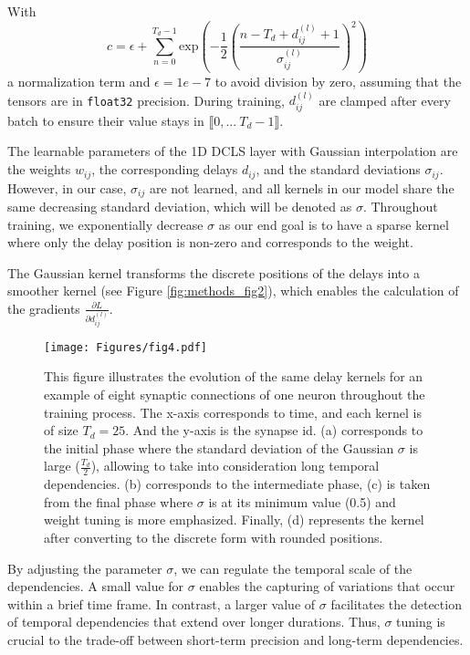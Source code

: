 \documentclass{article} \usepackage{iclr2024_conference,times}
\begin{document}
With \begin{equation} 
c = \epsilon + \sum_{n=0}^{T_d -1} \text{exp} \left({- \frac{1}{2}\left(\frac{n - T_d + d_{ij}^{(l)} + 1 }{\sigma_{ij}^{(l)}} \right)^2} \right)
\end{equation} a normalization term and $\epsilon = 1e-7$ to avoid division by zero, assuming that the tensors are in \texttt{float32} precision. During training, $d_{ij}^{(l)}$ are clamped after every batch to ensure their value stays in $\llbracket 0, ... \ T_d-1 \rrbracket$.

The learnable parameters of the 1D DCLS layer with Gaussian interpolation are the weights $w_{ij}$, the corresponding delays $d_{ij}$, and the standard deviations $\sigma_{ij}$. However, in our case, $\sigma_{ij}$ are not learned, and all kernels in our model share the same decreasing standard deviation, which will be denoted as $\sigma$. Throughout training, we exponentially decrease $\sigma$ as our end goal is to have a sparse kernel where only the delay position is non-zero and corresponds to the weight.

The Gaussian kernel transforms the discrete positions of the delays into a smoother kernel (see Figure \ref{fig:methods_fig2}), which enables the calculation of the gradients $\frac{\partial L}{\partial d_{ij}^{(l)}}$.

\begin{figure}[!ht]

  \centering
  \texttt{[image: Figures/fig4.pdf]}
  \caption{ This figure illustrates the evolution of the same delay kernels for an example of eight synaptic connections of one neuron throughout the training process. The x-axis corresponds to time, and each kernel is of size $T_d=25$. And the y-axis is the synapse id. (a) corresponds to the initial phase where the standard deviation of the Gaussian $\sigma$ is large ($\frac{T_d}{2}$), allowing to take into consideration long temporal dependencies. (b) corresponds to the intermediate phase, (c) is taken from the final phase where $\sigma$ is at its minimum value (0.5) and weight tuning is more emphasized. Finally, (d) represents the kernel after converting to the discrete form with rounded positions.}
  \label{fig:methods_fig3}
\end{figure}


By adjusting the parameter $\sigma$, we can regulate the temporal scale of the dependencies. A small value for $\sigma$ enables the capturing of variations that occur within a brief time frame. In contrast, a larger value of $\sigma$ facilitates the detection of temporal dependencies that extend over longer durations. Thus, $\sigma$ tuning is crucial to the trade-off between short-term precision and long-term dependencies.
\end{document}
